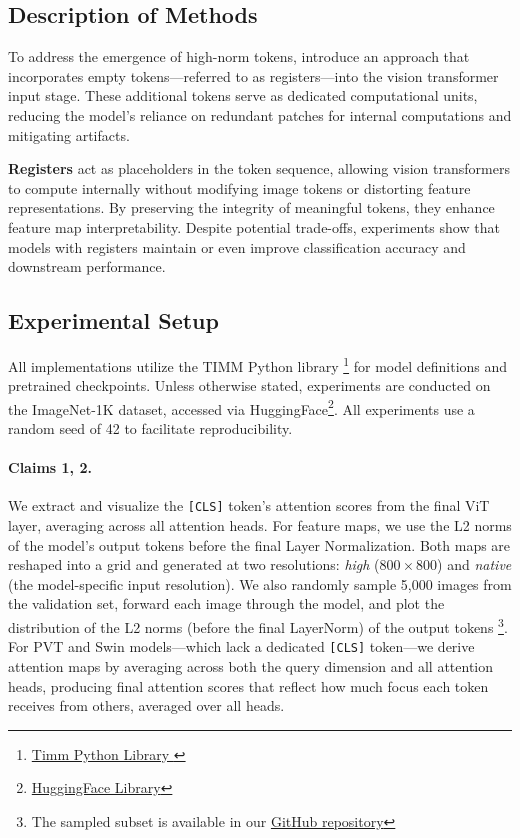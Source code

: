 \documentclass[10pt]{article} %
\begin{document}
\subsection{Description of Methods}
To address the emergence of high-norm tokens, \citet{darcet2024registers} introduce an approach that incorporates empty tokens—referred to as registers—into the vision transformer input stage. These additional tokens serve as dedicated computational units, reducing the model’s reliance on redundant patches for internal computations and mitigating artifacts.

\textbf{Registers} act as placeholders in the token sequence, allowing vision transformers to compute internally without modifying image tokens or distorting feature representations. By preserving the integrity of meaningful tokens, they enhance feature map interpretability. Despite potential trade-offs, experiments show that models with registers maintain or even improve classification accuracy and downstream performance.

\subsection{Experimental Setup}
\label{sec:experimental_setup}
All implementations utilize the TIMM Python library \footnote{\href{https://github.com/rwightman/pytorch-image-models}{Timm Python Library }} for model definitions and pretrained checkpoints. Unless otherwise stated, experiments are conducted on the ImageNet-1K \citep{deng2009imagenet} dataset, accessed via HuggingFace\footnote{\href{https://huggingface.com}{HuggingFace Library}}. All experiments use a random seed of 42 to facilitate reproducibility.

\paragraph{Claims 1, 2.}
We extract and visualize the \texttt{[CLS]} token's attention scores from the final ViT layer, averaging across all attention heads. For feature maps, we use the L2 norms of the model's output tokens before the final Layer Normalization. Both maps are reshaped into a grid and generated at two resolutions: \emph{high} ($800 \times 800$) and \emph{native} (the model-specific input resolution). We also randomly sample 5,000 images from the validation set, forward each image through the model, and plot the distribution of the L2 norms (before the
final LayerNorm) of the output tokens \footnote{The sampled subset is available in our \href{https://anonymous.4open.science/r/VitReg-4C8B/}{GitHub repository}}.
For PVT \citep{wang2022pvt} and Swin \citep{liu2021swin} models—which lack a dedicated \texttt{[CLS]} token—we derive attention maps by averaging across both the query dimension and all attention heads, producing final attention scores that reflect how much focus each token receives from others, averaged over all heads.
\end{document}
